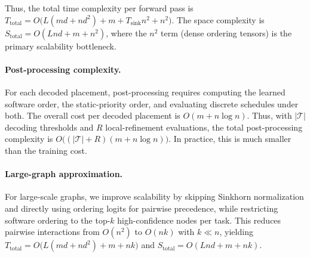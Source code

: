 Thus, the total time complexity per forward pass is $T_{\text{total}} = O\!\big(L(md + nd^2) + m + T_{\mathrm{sink}} n^2 + n^2\big)$. The space complexity is $S_{\text{total}} = O(Lnd + m + n^2)$, where the $n^2$ term (dense ordering tensors) is the primary scalability bottleneck.


\paragraph{\textbf{Post-processing complexity.}}
For each decoded placement, post-processing requires computing the learned software order, the static-priority order, and evaluating discrete schedules under both. The overall cost per decoded placement is $O(m+n\log n)$. Thus, with $|\mathcal{T}|$ decoding thresholds and $R$ local-refinement evaluations, the total post-processing complexity is $O\!\big((|\mathcal{T}|+R)(m+n\log n)\big)$. In practice, this is much smaller than the training cost.

\paragraph{\textbf{Large-graph approximation.}}
For large-scale graphs, we improve scalability by skipping Sinkhorn normalization and directly using ordering logits for pairwise precedence, while restricting software ordering to the top-$k$ high-confidence nodes per task. This reduces pairwise interactions from $O(n^2)$ to $O(nk)$ with $k \ll n$, yielding $T_{\text{total}} = O\!\big(L(md+nd^2)+m+nk\big)$ and $S_{\text{total}} = O(Lnd+m+nk)$.
